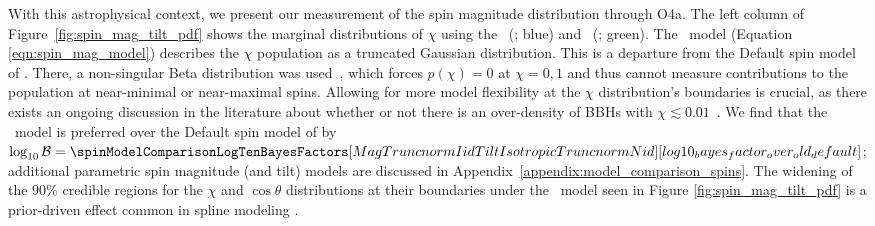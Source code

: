 With this astrophysical context, we present our measurement of the spin magnitude distribution through O4a. 
The left column of Figure~\ref{fig:spin_mag_tilt_pdf} shows the marginal distributions of $\chi$ using the \parametric~(; blue) and \nonparametric~(\BSpline; green).
The ~model (Equation \ref{eqn:spin_mag_model}) describes the $\chi$ population as a truncated Gaussian distribution.
This is a departure from the {\sc Default} spin model of \gwtcthree.
There, a non-singular Beta distribution was used~\citep{KAGRA:2021duu}, which forces $p(\chi)=0$ at $\chi=0,1$ and thus cannot measure contributions to the population at near-minimal or near-maximal spins.
Allowing for more model flexibility at the $\chi$ distribution's boundaries is crucial, as there exists an ongoing discussion in the literature about whether or not there is an over-density of \acp{BBH} with $\chi \lesssim 0.01$~\citep{Kimball:2020opk,Galaudage:2021rkt,Callister:2022qwb,Tong:2022iws,Mould:2022xeu,Hussain:2024qzl}.
We find that the ~model is preferred over the {\sc Default} spin model of \gwtcthree by $\log_{10} {\cal B} = \spinModelComparisonLogTenBayesFactors[MagTruncnormIidTiltIsotropicTruncnormNid][log10_bayes_factor_over_old_default]$; additional parametric spin magnitude (and tilt) models are discussed in Appendix~\ref{appendix:model_comparison_spins}.
The widening of the 90\% credible regions for the $\chi$ and $\cos\theta$ distributions at their boundaries under the \BSpline~model seen in Figure \ref{fig:spin_mag_tilt_pdf} is a prior-driven effect common in spline modeling \citep[e.g.,][]{Golomb:2022bon,Edelman:2022ydv}.

